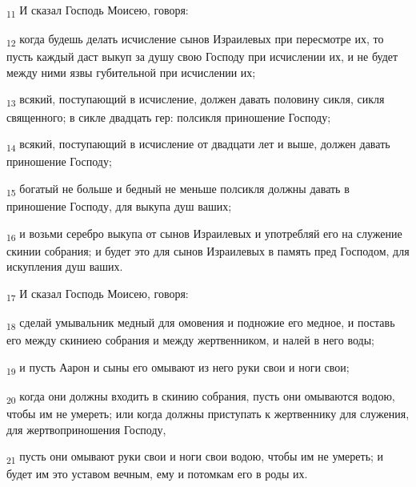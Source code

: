 \begin{tcolorbox}
\textsubscript{11} И сказал Господь Моисею, говоря:
\end{tcolorbox}
\begin{tcolorbox}
\textsubscript{12} когда будешь делать исчисление сынов Израилевых при пересмотре их, то пусть каждый даст выкуп за душу свою Господу при исчислении их, и не будет между ними язвы губительной при исчислении их;
\end{tcolorbox}
\begin{tcolorbox}
\textsubscript{13} всякий, поступающий в исчисление, должен давать половину сикля, сикля священного; в сикле двадцать гер: полсикля приношение Господу;
\end{tcolorbox}
\begin{tcolorbox}
\textsubscript{14} всякий, поступающий в исчисление от двадцати лет и выше, должен давать приношение Господу;
\end{tcolorbox}
\begin{tcolorbox}
\textsubscript{15} богатый не больше и бедный не меньше полсикля должны давать в приношение Господу, для выкупа душ ваших;
\end{tcolorbox}
\begin{tcolorbox}
\textsubscript{16} и возьми серебро выкупа от сынов Израилевых и употребляй его на служение скинии собрания; и будет это для сынов Израилевых в память пред Господом, для искупления душ ваших.
\end{tcolorbox}
\begin{tcolorbox}
\textsubscript{17} И сказал Господь Моисею, говоря:
\end{tcolorbox}
\begin{tcolorbox}
\textsubscript{18} сделай умывальник медный для омовения и подножие его медное, и поставь его между скиниею собрания и между жертвенником, и налей в него воды;
\end{tcolorbox}
\begin{tcolorbox}
\textsubscript{19} и пусть Аарон и сыны его омывают из него руки свои и ноги свои;
\end{tcolorbox}
\begin{tcolorbox}
\textsubscript{20} когда они должны входить в скинию собрания, пусть они омываются водою, чтобы им не умереть; или когда должны приступать к жертвеннику для служения, для жертвоприношения Господу,
\end{tcolorbox}
\begin{tcolorbox}
\textsubscript{21} пусть они омывают руки свои и ноги свои водою, чтобы им не умереть; и будет им это уставом вечным, ему и потомкам его в роды их.
\end{tcolorbox}
